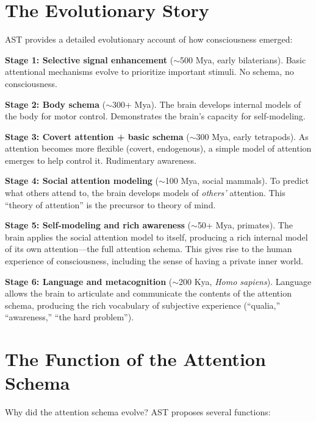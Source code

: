 \documentclass[11pt,a4paper]{report}
\begin{document}
\section{The Evolutionary Story}

AST provides a detailed evolutionary account of how consciousness emerged:

\begin{modelbox}
\textbf{Stage 1: Selective signal enhancement} ($\sim$500 Mya, early bilaterians). Basic attentional mechanisms evolve to prioritize important stimuli. No schema, no consciousness.

\textbf{Stage 2: Body schema} ($\sim$300+ Mya). The brain develops internal models of the body for motor control. Demonstrates the brain's capacity for self-modeling.

\textbf{Stage 3: Covert attention + basic schema} ($\sim$300 Mya, early tetrapods). As attention becomes more flexible (covert, endogenous), a simple model of attention emerges to help control it. Rudimentary awareness.

\textbf{Stage 4: Social attention modeling} ($\sim$100 Mya, social mammals). To predict what others attend to, the brain develops models of \emph{others'} attention. This ``theory of attention'' is the precursor to theory of mind.

\textbf{Stage 5: Self-modeling and rich awareness} ($\sim$50+ Mya, primates). The brain applies the social attention model to itself, producing a rich internal model of its own attention---the full attention schema. This gives rise to the human experience of consciousness, including the sense of having a private inner world.

\textbf{Stage 6: Language and metacognition} ($\sim$200 Kya, \textit{Homo sapiens}). Language allows the brain to articulate and communicate the contents of the attention schema, producing the rich vocabulary of subjective experience (``qualia,'' ``awareness,'' ``the hard problem'').
\end{modelbox}

\section{The Function of the Attention Schema}

Why did the attention schema evolve? AST proposes several functions:
\end{document}
